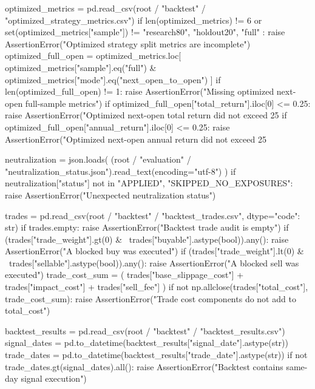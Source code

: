 \documentclass[UTF8,a4paper,fontset=fandol]{ctexart}
\begin{document}
\begin{ProjectCode}
    optimized_metrics = pd.read_csv(root / "backtest" / "optimized_strategy_metrics.csv")
    if len(optimized_metrics) != 6 or set(optimized_metrics["sample"]) != {
        "research80", "holdout20", "full"
    }:
        raise AssertionError("Optimized strategy split metrics are incomplete")
    optimized_full_open = optimized_metrics.loc[
        optimized_metrics["sample"].eq("full")
        & optimized_metrics["mode"].eq("next_open_to_open")
    ]
    if len(optimized_full_open) != 1:
        raise AssertionError("Missing optimized next-open full-sample metrics")
    if optimized_full_open["total_return"].iloc[0] <= 0.25:
        raise AssertionError("Optimized next-open total return did not exceed 25%
    if optimized_full_open["annual_return"].iloc[0] <= 0.25:
        raise AssertionError("Optimized next-open annual return did not exceed 25%

    neutralization = json.loads(
        (root / "evaluation" / "neutralization_status.json").read_text(encoding="utf-8")
    )
    if neutralization["status"] not in {"APPLIED", "SKIPPED_NO_EXPOSURES"}:
        raise AssertionError("Unexpected neutralization status")

    trades = pd.read_csv(root / "backtest" / "backtest_trades.csv", dtype={"code": str})
    if trades.empty:
        raise AssertionError("Backtest trade audit is empty")
    if (trades["trade_weight"].gt(0) & ~trades["buyable"].astype(bool)).any():
        raise AssertionError("A blocked buy was executed")
    if (trades["trade_weight"].lt(0) & ~trades["sellable"].astype(bool)).any():
        raise AssertionError("A blocked sell was executed")
    trade_cost_sum = (
        trades["base_slippage_cost"] + trades["impact_cost"] + trades["sell_fee"]
    )
    if not np.allclose(trades["total_cost"], trade_cost_sum):
        raise AssertionError("Trade cost components do not add to total_cost")

    backtest_results = pd.read_csv(root / "backtest" / "backtest_results.csv")
    signal_dates = pd.to_datetime(backtest_results["signal_date"].astype(str))
    trade_dates = pd.to_datetime(backtest_results["trade_date"].astype(str))
    if not trade_dates.gt(signal_dates).all():
        raise AssertionError("Backtest contains same-day signal execution")


\end{ProjectCode}
\end{document}
